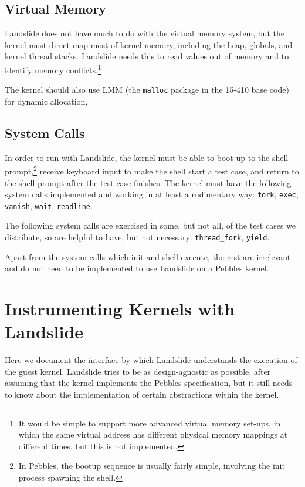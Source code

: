 \subsection{Virtual Memory}

Landslide does not have much to do with the virtual memory system, but the kernel must direct-map most of kernel memory, including the heap, globals, and kernel thread stacks. Landslide needs this to read values out of memory and to identify memory conflicts.\footnote{
It would be simple to support more advanced virtual memory set-ups, in which the same virtual address has different physical memory mappings at different times, but this is not implemented.}

The kernel should also use LMM (the \texttt{malloc} package in the 15-410 base code) for dynamic allocation, 

\subsection{System Calls}

In order to run with Landslide, the kernel must be able to boot up to the shell prompt,\footnote{
In Pebbles, the bootup sequence is usually fairly simple, involving the init process spawning the shell.}
receive keyboard input to make the shell start a test case, and return to the shell prompt after the test case finishes. The kernel must have the following system calls implemented and working in at least a rudimentary way:
\texttt{fork}, \texttt{exec}, \texttt{vanish}, \texttt{wait}, \texttt{readline}.

The following system calls are exercised in some, but not all, of the test cases we distribute, so are helpful to have, but not necessary:
\texttt{thread\_fork}, \texttt{yield}.

Apart from the system calls which init and shell execute, the rest are irrelevant and do not need to be implemented to use Landslide on a Pebbles kernel.

\section{Instrumenting Kernels with Landslide}
\label{sec:using-instrumenting}

Here we document the interface by which Landslide understands the execution of the guest kernel. Landslide tries to be as design-agnostic as possible, after assuming that the kernel implements the Pebbles specification, but it still needs to know about the implementation of certain abstractions within the kernel.

